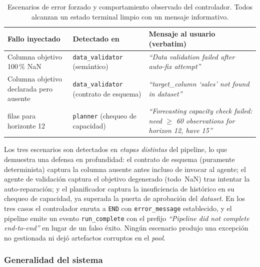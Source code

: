 \begin{table}[H]
\centering
\caption{Escenarios de error forzado y comportamiento observado del controlador.
 Todos alcanzan un estado terminal limpio con un mensaje informativo.}
\label{tab:robustez}
\small
\begin{tabular}{p{3.0cm}p{3.4cm}p{6.4cm}}
\toprule
\textbf{Fallo inyectado} & \textbf{Detectado en} & \textbf{Mensaje al usuario (verbatim)} \\
\midrule
Columna objetivo 100\,\% NaN
  & \texttt{data\_validator} (semántico)
  & \textit{``Data validation failed after auto-fix attempt''} \\
\addlinespace
Columna objetivo declarada pero ausente
  & \texttt{data\_validator} (contrato de esquema)
  & \textit{``target\_column `sales' not found in dataset''} \\
\addlinespace
15 filas para horizonte 12
  & \texttt{planner} (chequeo de capacidad)
  & \textit{``Forecasting capacity check failed: need $\geq$ 60 observations for horizon 12, have 15''} \\
\bottomrule
\end{tabular}
\end{table}

Los tres escenarios son detectados en \emph{etapas distintas} del pipeline, lo que
demuestra una defensa en profundidad: el contrato de esquema (puramente determinista)
captura la columna ausente antes incluso de invocar al agente; el agente de validación
captura el objetivo degenerado (todo~NaN) tras intentar la auto-reparación; y el
planificador captura la insuficiencia de histórico en su chequeo de capacidad, ya
superada la puerta de aprobación del \textit{dataset}. En los tres casos el controlador
enruta a \texttt{END} con \texttt{error\_message} establecido, y el pipeline emite un
evento \texttt{run\_complete} con el prefijo \textit{``Pipeline did not complete
end-to-end''} en lugar de un falso éxito. Ningún escenario produjo una excepción no
gestionada ni dejó artefactos corruptos en el \textit{pool}.


\subsubsection{Generalidad del sistema}
\label{sec:caso-generalidad}

